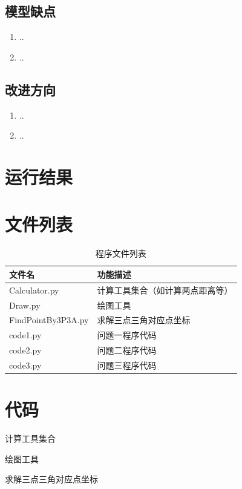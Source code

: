 \documentclass[withoutpreface,bwprint]{cumcmthesis} %
\begin{document}
\subsection{模型缺点}
\begin{enumerate}
    \item ..
    \item ..
\end{enumerate}

\subsection{改进方向}
\begin{enumerate}
    \item ..
    \item ..
\end{enumerate}




\begin{appendices}

\section{运行结果}


\section{文件列表}
\begin{table}[H]
    \caption{程序文件列表}
    \centering
    \begin{tabularx}{\textwidth}{l X}
        \bottomrule
        文件名 & 功能描述 \\
        \midrule
        Calculator.py & 计算工具集合（如计算两点距离等） \\
        Draw.py & 绘图工具 \\
        FindPointBy3P3A.py & 求解三点三角对应点坐标 \\
        code1.py & 问题一程序代码 \\
        code2.py & 问题二程序代码 \\
        code3.py & 问题三程序代码 \\
        \bottomrule
    \end{tabularx}
    \label{tab:文件列表}
\end{table}

\section{代码}
计算工具集合

绘图工具

求解三点三角对应点坐标


\end{appendices}
\end{document}
